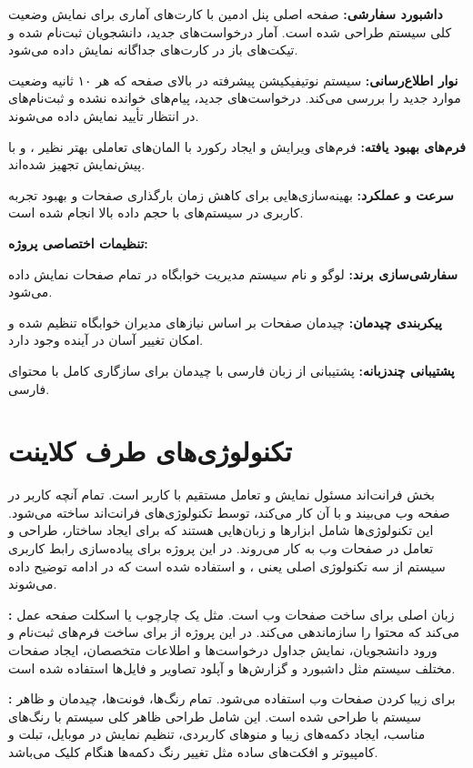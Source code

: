 \documentclass[12pt,a4paper]{report}
\begin{document}
	\textbf{داشبورد سفارشی:} صفحه اصلی پنل ادمین با کارت‌های آماری برای نمایش وضعیت کلی سیستم طراحی شده است. آمار درخواست‌های جدید، دانشجویان ثبت‌نام شده و تیکت‌های باز در کارت‌های جداگانه نمایش داده می‌شود.
	
	\textbf{نوار اطلاع‌رسانی:} سیستم نوتیفیکیشن پیشرفته در بالای صفحه که هر ۱۰ ثانیه وضعیت موارد جدید را بررسی می‌کند. درخواست‌های جدید، پیام‌های خوانده نشده و ثبت‌نام‌های در انتظار تأیید نمایش داده می‌شوند.
	
	\textbf{فرم‌های بهبود یافته:} فرم‌های ویرایش و ایجاد رکورد با المان‌های تعاملی بهتر نظیر ،  و  با پیش‌نمایش تجهیز شده‌اند.
	
	\textbf{سرعت و عملکرد:} بهینه‌سازی‌هایی برای کاهش زمان بارگذاری صفحات و بهبود تجربه کاربری در سیستم‌های با حجم داده بالا انجام شده است.
	
	\textbf{تنظیمات اختصاصی پروژه:}
	
	\textbf{سفارشی‌سازی برند:} لوگو و نام سیستم مدیریت خوابگاه در تمام صفحات نمایش داده می‌شود.
	
	\textbf{پیکربندی چیدمان:} چیدمان صفحات بر اساس نیازهای مدیران خوابگاه تنظیم شده و امکان تغییر آسان در آینده وجود دارد.
	
	\textbf{پشتیبانی چندزبانه:} پشتیبانی از زبان فارسی با چیدمان  برای سازگاری کامل با محتوای فارسی.
	
	\section{تکنولوژی‌های طرف کلاینت}
	بخش فرانت‌اند مسئول نمایش و تعامل مستقیم با کاربر است. تمام آنچه کاربر در صفحه وب می‌بیند و با آن کار می‌کند، توسط تکنولوژی‌های فرانت‌اند ساخته می‌شود. این تکنولوژی‌ها شامل ابزارها و زبان‌هایی هستند که برای ایجاد ساختار، طراحی و تعامل در صفحات وب به کار می‌روند. در این پروژه برای پیاده‌سازی رابط کاربری سیستم از سه تکنولوژی اصلی یعنی \textbf{}، \textbf{} و \textbf{} استفاده شده است که در ادامه توضیح داده می‌شوند.
	
	\textbf{:} زبان اصلی برای ساخت صفحات وب است. مثل یک چارچوب یا اسکلت صفحه عمل می‌کند که محتوا را سازماندهی می‌کند. در این پروژه از  برای ساخت فرم‌های ثبت‌نام و ورود دانشجویان، نمایش جداول درخواست‌ها و اطلاعات متخصصان، ایجاد صفحات مختلف سیستم مثل داشبورد و گزارش‌ها و آپلود تصاویر و فایل‌ها استفاده شده است.
	
	\textbf{:} برای زیبا کردن صفحات وب استفاده می‌شود. تمام رنگ‌ها، فونت‌ها، چیدمان و ظاهر سیستم با  طراحی شده است. این شامل طراحی ظاهر کلی سیستم با رنگ‌های مناسب، ایجاد دکمه‌های زیبا و منوهای کاربردی، تنظیم نمایش در موبایل، تبلت و کامپیوتر و افکت‌های ساده مثل تغییر رنگ دکمه‌ها هنگام کلیک می‌باشد.
	
\end{document}
